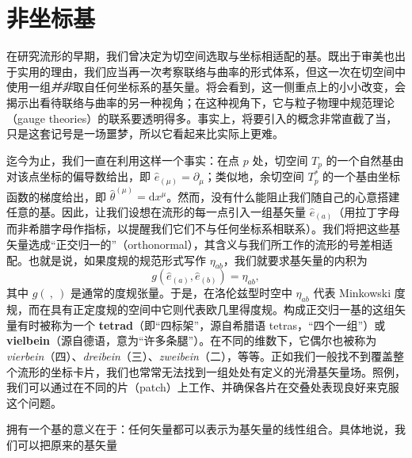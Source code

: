 \chapter{非坐标基}

在研究流形的早期，我们曾决定为切空间选取与坐标相适配的基。既出于审美也出于实用的理由，我们应当再一次考察联络与曲率的形式体系，但这一次在切空间中使用一组\emph{并非}取自任何坐标系的基矢量。将会看到，这一侧重点上的小小改变，会揭示出看待联络与曲率的另一种视角；在这种视角下，它与粒子物理中规范理论（gauge theories）的联系要透明得多。事实上，将要引入的概念非常直截了当，只是这套记号是一场噩梦，所以它看起来比实际上更难。

迄今为止，我们一直在利用这样一个事实：在点 $p$ 处，切空间 $T_{p}$ 的一个自然基由对该点坐标的偏导数给出，即 $\hat{e}_{(\mu)} = \partial_{\mu}$；类似地，余切空间 $T_{p}^{*}$ 的一个基由坐标函数的梯度给出，即 $\hat{\theta}^{(\mu)} = \mathrm{d}x^{\mu}$。然而，没有什么能阻止我们随自己的心意搭建任意的基。因此，让我们设想在流形的每一点引入一组基矢量 $\hat{e}_{(a)}$（用拉丁字母而非希腊字母作指标，以提醒我们它们不与任何坐标系相联系）。我们将把这些基矢量选成“正交归一的”（orthonormal），其含义与我们所工作的流形的号差相适配。也就是说，如果度规的规范形式写作 $\eta_{ab}$，我们就要求基矢量的内积为
\begin{equation*}
g(\hat{e}_{(a)}, \hat{e}_{(b)}) = \eta_{ab},
\tag{J.1}
\end{equation*}
其中 $g(\ ,\ )$ 是通常的度规张量。于是，在洛伦兹型时空中 $\eta_{ab}$ 代表 Minkowski 度规，而在具有正定度规的空间中它则代表欧几里得度规。构成正交归一基的这组矢量有时被称为一个 \textbf{tetrad}（即“四标架”，源自希腊语 tetras，“四个一组”）或 \textbf{vielbein}（源自德语，意为“许多条腿”）。在不同的维数下，它偶尔也被称为 \emph{vierbein}（四）、\emph{dreibein}（三）、\emph{zweibein}（二），等等。正如我们一般找不到覆盖整个流形的坐标卡片，我们也常常无法找到一组处处有定义的光滑基矢量场。照例，我们可以通过在不同的片（patch）上工作、并确保各片在交叠处表现良好来克服这个问题。

拥有一个基的意义在于：任何矢量都可以表示为基矢量的线性组合。具体地说，我们可以把原来的基矢量

